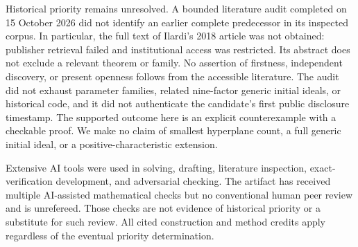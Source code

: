 \documentclass[11pt]{article}
\begin{document}
Historical priority remains unresolved. A bounded literature audit completed
on 15 October 2026 did not identify an earlier complete predecessor in its
inspected corpus. In particular, the full text
of Ilardi's 2018 article \cite{Ilardi} was not obtained: publisher retrieval
failed and institutional access was restricted. Its abstract does not
exclude a relevant theorem or family. No assertion of firstness, independent
discovery, or present openness follows from the accessible literature.
The audit did not exhaust parameter families, related nine-factor generic
initial ideals, or historical code, and it did not authenticate the
candidate's first public disclosure timestamp.
The supported outcome here is an explicit counterexample with a checkable
proof. We make no claim of smallest hyperplane count, a full generic initial
ideal, or a positive-characteristic extension.

Extensive AI tools were used in solving, drafting, literature inspection,
exact-verification development, and adversarial checking. The artifact has
received multiple AI-assisted mathematical checks but no conventional human
peer review and is unrefereed. Those checks are not evidence of historical
priority or a substitute for such review. All cited construction and method
credits apply regardless of the eventual priority determination.
\end{document}
